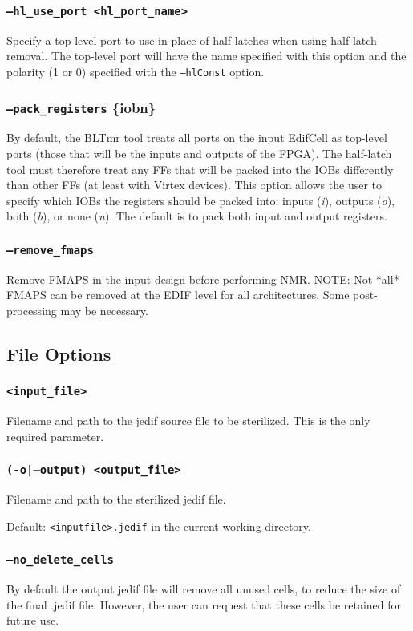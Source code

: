 \subsubsection{\texttt{--hl\_use\_port <hl\_port\_name>}}
Specify a top-level port to use in place of half-latches when 
using half-latch removal. The top-level port will have the name specified with 
this option and the polarity (1 or 0) specified with the \texttt{--hlConst} 
option.

\subsubsection{\texttt{--pack\_registers} \{i\textbar o\textbar b\textbar n\}}
By default, the BLTmr tool treats all ports on the input EdifCell as top-level
ports (those that will be the inputs and outputs of the FPGA). The half-latch 
tool must therefore treat any FFs that will be packed into the IOBs differently
than other FFs (at least with Virtex devices). This option allows the user to
specify which IOBs the registers should be packed into: inputs (\emph{i}),
outputs (\emph{o}), both (\emph{b}), or none (\emph{n}). The default is to pack
both input and output registers.

\subsubsection{\texttt{--remove\_fmaps}}
Remove FMAPS in the input design before performing NMR.
NOTE: Not *all* FMAPS can be removed at the EDIF level for all
architectures. Some post-processing may be necessary.

\subsection{File Options}

\subsubsection{\texttt{<input\_file>}}
Filename and path to the jedif source file to be
sterilized. This is the only required parameter.

\subsubsection{\texttt{(-o|--output) <output\_file>}}
Filename and path to the sterilized jedif file. 

Default: \texttt{<inputfile>.jedif} in the current working directory.


\subsubsection{\texttt{--no\_delete\_cells}}
By default the output jedif file will remove all unused cells, to 
reduce the size of the final .jedif file. 
However, the user can request that these cells be retained for 
future use.



